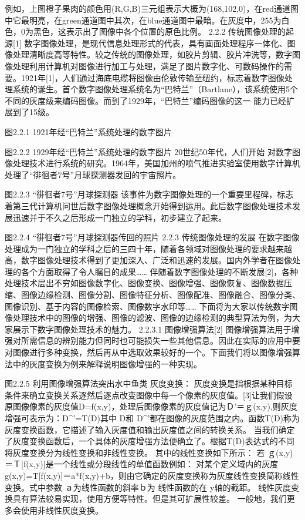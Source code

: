 	例如，上图橙子果肉的颜色用(R,G,B)三元组表示大概为(168,102,0)，在red通道图中它最明亮，在green通道图中其次，在blue通道图中最暗。在灰度中，255为白色，0为黑色，这表示出了图像中各个位置的原色比例。
2.2.2 传统图像处理的起源[1]
	数字图像处理，是现代信息处理形式的代表，具有画面处理程序一体化、图像处理清晰度高等特性。较之传统的图像处理，如胶片剪辑、胶片冲洗等，数字图像处理利用计算机对图像进行加工与处理，满足了图片数字化、可数码操作的需要。1921年[1]，人们通过海底电缆将图像由伦敦传输至纽约，标志着数字图像处理系统的诞生。首个数字图像处理系统名为“巴特兰”（Bartlane），该系统使用5个不同的灰度级来编码图像。而到了1929年，“巴特兰”编码图像的这一 能力已经扩展到了15级。

图2.2.1 1921年经“巴特兰”系统处理的数字图片

图2.2.2 1929年经“巴特兰”系统处理的数字图片
20世纪50年代，人们开始 对数字图像处理技术进行系统的研究。1964年，美国加州的喷气推进实验室使用数字计算机处理了“徘徊者7号”月球探测器发回的宇宙照片。

图2.2.3 “徘徊者7号”月球探测器
该事件为数字图像处理的一个重要里程碑，标志着第三代计算机问世后数字图像处理概念开始得到运用。此后数字图像处理技术发展迅速并于不久之后形成一门独立的学科，初步建立了起来。

图2.2.4 “徘徊者7号”月球探测器传回的照片
2.2.3 传统图像处理的发展
	在数字图像处理成为一门独立的学科之后的三四十年，随着各领域对图像处理的要求越来越高，数字图像处理技术得到了更加深入、广泛和迅速的发展。国内外学者在图像处理的各个方面取得了令人瞩目的成果……
	伴随着数字图像处理的不断发展[2]，各种处理技术层出不穷如图像数字化、图像变换、图像增强、图像恢复、图像数据压缩、图像边缘检测、图像分割、图像特征分析、图像配准、图像融合、图像分类、图像识别、基于内容的图像检索、图像数字水印等……
	下面将为大家以传统数字图像处理技术中的图像的增强、图像的滤波、图像的边缘检测的典型算法为例，为大家展示下数字图像处理技术的魅力。
2.2.3.1 图像增强算法[2]
图像增强算法用于增强对所需信息的辨别能力但同时也可能损失一些其他信息。因此在实际的应用中要对图像进行多种变换，然后再从中选取效果较好的一个。下面我们将以图像增强算法中的灰度变换为例来解释说明图像增强的一种实现。

图2.2.5 利用图像增强算法突出水中鱼类
灰度变换：
	灰度变换是指根据某种目标条件来确立变换关系逐然后逐点改变图像中每一个像素的灰度值。[3]让我们假设原图像像素的灰度值D=f(x,y)，处理后图像像素的灰度值记为Ｄ'＝ｇ(x,y),则灰度增强可表示为：D^'=T(D)其中 D和 D^'都在图像的灰度范围之内。函数T(D)称为灰度变换函数，它描述了输入灰度值和输出灰度值之间的转换关系。 当我们确定了灰度变换函数后，一个具体的灰度增强方法便确立了。根据T(D)表达式的不同将灰度变换分为线性变换和非线性变换。
	其中的线性变换如下所示：
	若 ｇ(x,y)＝Ｔ[f(x,y)]是一个线性或分段线性的单值函数例如：
	对某个定义域内的灰度 g(x,y)=T[f(x,y)]＝a*f(x,y)+b，则由它确定的灰度变换称为灰度线性变换简称线性变换。式中参数 ａ为线性函数的斜率ｂ为 线性函数的在 y轴的截距。
线性灰度变换具有算法较易实现，使用方便等特性。但是其可扩展性较差。
一般地，我们更多会使用非线性灰度变换。



